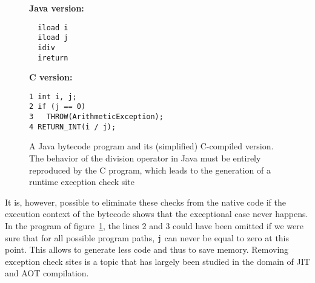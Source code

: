 \begin{figure}[t]
\begin{frameit}
\begin{center}
\begin{minipage}[b]{0.4\linewidth}
\textbf{Java version:}
\centering
\begin{lstlisting}
  iload i
  iload j
  idiv
  ireturn
\end{lstlisting}
\end{minipage}
\hspace{0.2cm}
\begin{minipage}[b]{0.5\linewidth}
\textbf{C version:}
\centering
\begin{lstlisting}
1 int i, j;
2 if (j == 0) 
3   THROW(ArithmeticException);
4 RETURN_INT(i / j);
\end{lstlisting}
\end{minipage}
\end{center}
\caption{\sc A Java bytecode program and its (simplified) C-compiled version. The behavior of the division operator in Java must be entirely reproduced by the C program, which leads to the generation of a runtime exception check site}
\label{fig:javatoc}
\end{frameit}
\end{figure}

It is, however, possible to eliminate these checks from the native code if the execution context of the bytecode shows that the exceptional case never happens. In the program of figure~\ref{fig:javatoc}, the lines 2 and 3 could have been omitted if we were sure that for all possible program paths, \texttt{j} can never be equal to zero at this point. This allows to generate less code and thus to save memory. Removing exception check sites is a topic that has largely been studied in the domain of JIT and AOT compilation.
